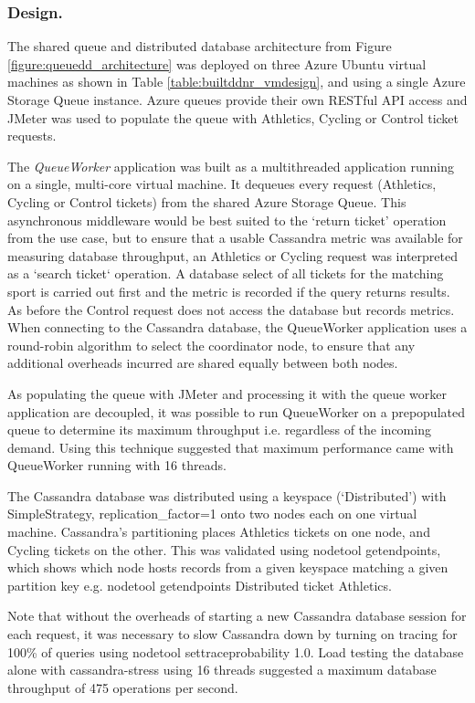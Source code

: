 \subsubsection{Design.}  The shared queue and distributed database architecture from Figure \ref{figure:queuedd_architecture} was deployed on three Azure Ubuntu virtual machines as shown in Table \ref{table:builtddnr_vmdesign}, and using a single Azure Storage Queue instance.  Azure queues provide their own RESTful API access and JMeter was used to populate the queue with Athletics, Cycling or Control ticket requests.

The {\itshape QueueWorker} application was built as a multithreaded application running on a single, multi-core virtual machine.  It dequeues every request (Athletics, Cycling or Control tickets) from the shared Azure Storage Queue.  This asynchronous middleware would be best suited to the `return ticket' operation from the use case, but to ensure that a usable Cassandra metric was available for measuring database throughput, an Athletics or Cycling request was interpreted as a `search ticket` operation.  A database select of all tickets for the matching sport is carried out first and the metric is recorded if the query returns results.  As before the Control request does not access the database but records metrics.  When connecting to the Cassandra database, the QueueWorker application uses a round-robin algorithm to select the coordinator node, to ensure that any additional overheads incurred are shared equally between both nodes.

As populating the queue with JMeter and processing it with the queue worker application are decoupled, it was possible to run QueueWorker on a prepopulated queue to determine its maximum throughput i.e. regardless of the incoming demand.  Using this technique suggested that maximum performance came with QueueWorker running with 16 threads.

The Cassandra database was distributed using a keyspace (`Distributed') with SimpleStrategy, replication\_factor=1 onto two nodes each on one virtual machine.  Cassandra's partitioning places Athletics tickets on one node, and Cycling tickets on the other.  This was validated using nodetool getendpoints, which shows which node hosts records from a given keyspace matching a given partition key e.g. nodetool getendpoints Distributed ticket Athletics.

Note that without the overheads of starting a new Cassandra database session for each request, it was necessary to slow Cassandra down by turning on tracing for 100\% of queries using nodetool settraceprobability 1.0.  Load testing the database alone with cassandra-stress using 16 threads suggested a maximum database throughput of 475 operations per second.

